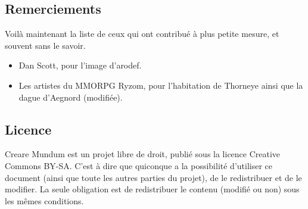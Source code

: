 \documentclass{book}
\begin{document}
\subsection{Remerciements}
Voilà maintenant la liste de ceux qui ont contribué à plus petite mesure, et souvent sans le savoir. 
\begin{itemize}
\item Dan Scott, pour l’image d’arodef.
\item Les artistes du MMORPG Ryzom, pour l'habitation de Thorneye ainsi que la dague d'Aegnord (modifiée). 
\end{itemize}
\subsection{Licence}
Creare Mundum est un projet libre de droit, publié sous la licence Creative Commons BY-SA. C'est à dire que quiconque a la possibilité d'utiliser ce document (ainsi que toute les autres parties du projet), de le redistribuer et de le modifier. La seule obligation est de redistribuer le contenu (modifié ou non) sous les mêmes conditions.
\end{document}

